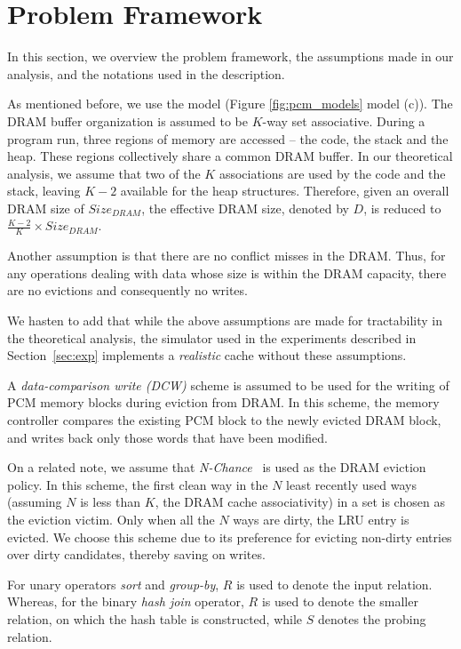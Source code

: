 \section{Problem Framework}
\label{assumptions}
In this section, we overview the problem framework, the assumptions made
in our analysis, and the notations used in the description.

As mentioned before, we use the \model{} model (Figure \ref{fig:pcm_models} model (c)). The DRAM buffer organization is assumed to be $K$-way set associative. During a program run, three regions of memory are accessed --
the code, the stack and the heap. These regions collectively share a common
DRAM buffer. In our theoretical analysis, we assume that two of the $K$ associations are used by the
code and the stack, leaving $K-2$ available for the heap structures.
Therefore, given an overall DRAM size of $Size_{DRAM}$, the effective
DRAM size, denoted by $D$, is reduced to $\frac{K-2}{K}
\times Size_{DRAM}$.

Another assumption is that there are no conflict misses in the DRAM. Thus,
for any operations dealing with data whose size is within the DRAM
capacity, there are no evictions and consequently no writes.

We hasten to add that while the above assumptions are made for
tractability in the theoretical analysis, the simulator used in the
experiments described in Section~\ref{sec:exp} implements a \emph{realistic}
cache without these assumptions.

A \textit{data-comparison write (DCW)} scheme \cite{write} is assumed to
be used for the writing of PCM memory blocks during eviction from DRAM. In this
scheme, the memory controller compares the existing PCM block to the
newly evicted DRAM block, and writes back only those words that have
been modified.

On a related note, we assume that \textit{N-Chance}~\cite{nchance} is
used as the DRAM eviction policy.  In this scheme, the first clean
way in the $N$ least recently used ways (assuming $N$ is less than $K$, 
the DRAM cache associativity) in a set is chosen as the eviction victim. Only
when all the $N$ ways are dirty, the LRU entry is evicted. We choose this
scheme due to its preference for evicting non-dirty entries over dirty
candidates, thereby saving on writes.

For unary operators \textit{sort} and \textit{group-by}, $R$ is used to
denote the input relation. Whereas, for the binary \textit{hash join} operator,
$R$ is used to denote the smaller relation, on which the hash table is
constructed, while  $S$ denotes the probing relation.

